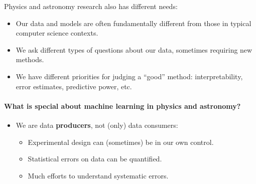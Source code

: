 \documentclass[%
oneside,                 %
final,                   %
10pt]{article}
\begin{document}
\noindent
Physics and astronomy research also has different needs:
\begin{itemize}
  \item Our data and models are often fundamentally different from those in typical computer science contexts.

  \item We ask different types of questions about our data, sometimes requiring new methods.

  \item We have different priorities for judging a ``good'' method: interpretability, error estimates, predictive power, etc.
\end{itemize}

\noindent
\paragraph{What is special about machine learning in physics and astronomy?}
\begin{itemize}
  \item We are data \textbf{producers}, not (only) data consumers:
\begin{itemize}

    \item Experimental design can (sometimes) be in our own control.

    \item Statistical errors on data can be quantified.

    \item Much efforts to understand systematic errors.
\end{itemize}

\noindent
\end{itemize}
\end{document}

